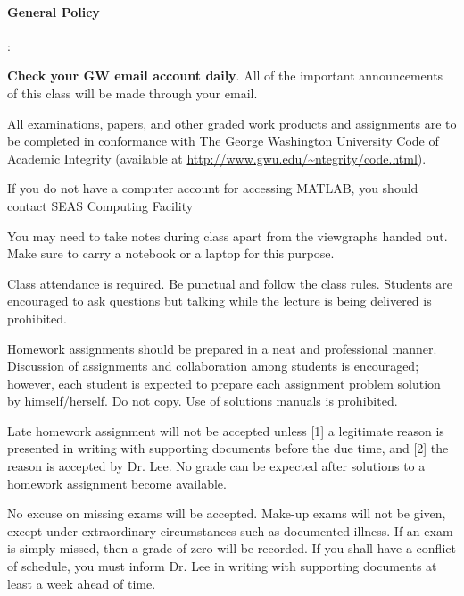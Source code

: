 \documentclass[10pt]{article}
\begin{document}
\paragraph*{General Policy}
\begin{list}
{:}
{\setlength{\itemsep}{-3pt}}

\item \textbf{Check your GW email account daily}. All of the important announcements of this class will be made through your email. 



\item All examinations, papers, and other graded work products and assignments are to be completed in conformance with The George Washington University Code of Academic Integrity (available at \url{http://www.gwu.edu/~ntegrity/code.html}).

\item If you do not have a computer account for accessing MATLAB, you should contact SEAS Computing Facility

\item You may need to take notes during class apart from the viewgraphs handed out. Make sure to carry a notebook or a laptop for this purpose.

\item Class attendance is required. Be punctual and follow the class rules. Students are encouraged to ask questions but talking while the lecture is being delivered is prohibited.

\item Homework assignments should be prepared in a neat and professional manner. Discussion of assignments and collaboration among students is  encouraged; however,  each student is expected to prepare each assignment problem solution by himself/herself. Do not copy. Use of solutions manuals is prohibited.

\item Late homework assignment will not be accepted unless [1] a legitimate reason is presented in writing with supporting documents before the due time, and [2] the reason is accepted by Dr. Lee. No grade can be expected after solutions to a homework assignment become available.

\item No excuse on missing exams will be accepted. Make-up exams will not be given, except under extraordinary circumstances such as documented illness. If an exam is simply missed, then a grade of zero will be recorded. If you shall have a conflict of schedule, you must inform Dr. Lee in writing with supporting documents at least a week ahead of time.


\end{list}
\end{document}
